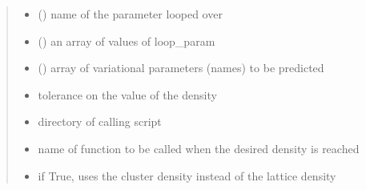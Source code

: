 \documentclass[letterpaper,10pt,english]{sphinxmanual}
\begin{document}
\begin{fulllineitems}
\begin{quote}
\begin{description}
\begin{itemize}
\item {} 
\sphinxAtStartPar
{} () \textendash{} name of the parameter looped over

\item {} 
\sphinxAtStartPar
{} () \textendash{} an array of values of loop\_param

\item {} 
\sphinxAtStartPar
{} () \textendash{} array of variational parameters (names) to be predicted

\item {} 
\sphinxAtStartPar
{} \textendash{} tolerance on the value of the density

\item {} 
\sphinxAtStartPar
{} \textendash{} directory of calling script

\item {} 
\sphinxAtStartPar
{} \textendash{} name of function to be called when the desired density is reached

\item {} 
\sphinxAtStartPar
{} \textendash{} if True, uses the cluster density instead of the lattice density

\end{itemize}

\end{description}\end{quote}

\end{fulllineitems}

\end{document}
